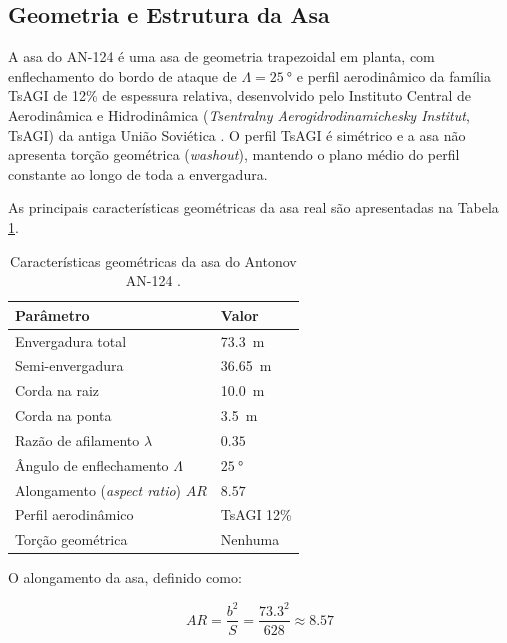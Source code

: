 \documentclass[a4paper,fleqn,noprintline]{cas-dc}
\begin{document}
\subsection{Geometria e Estrutura da Asa}

A asa do AN-124 é uma asa de geometria trapezoidal em planta, com enflechamento do bordo de ataque de $\Lambda = \qty{25}{\degree}$ e perfil aerodinâmico da família TsAGI de 12\% de espessura relativa, desenvolvido pelo Instituto Central de Aerodinâmica e Hidrodinâmica (\textit{Tsentralny Aerogidrodinamichesky Institut}, TsAGI) da antiga União Soviética \cite{Gordon2008, GarciaFernandez2025}. O perfil TsAGI é simétrico e a asa não apresenta torção geométrica (\textit{washout}), mantendo o plano médio do perfil constante ao longo de toda a envergadura.

As principais características geométricas da asa real são apresentadas na Tabela \ref{tab:asa_specs}.

\begin{table}[h!]
\centering
\caption{Características geométricas da asa do Antonov AN-124 
\cite{GarciaFernandez2025, Gordon2008}.}
\label{tab:asa_specs}
\renewcommand{\arraystretch}{1.4}
\begin{tabularx}{\textwidth}{p{5.5cm} X}
\toprule
\textbf{Parâmetro} & \textbf{Valor} \\
\midrule
Envergadura total & \SI{73.3}{\meter} \\
Semi-envergadura & \SI{36.65}{\meter} \\
Corda na raiz & \SI{10.0}{\meter} \\
Corda na ponta & \SI{3.5}{\meter} \\
Razão de afilamento $\lambda$ & $0.35$ \\
Ângulo de enflechamento $\Lambda$ & $\qty{25}{\degree}$ \\
Alongamento (\textit{aspect ratio}) $AR$ & $8.57$ \\
Perfil aerodinâmico & TsAGI 12\% \\
Torção geométrica & Nenhuma \\
\bottomrule
\end{tabularx}
\end{table}

O alongamento da asa, definido como:

\begin{equation}
    AR = \frac{b^2}{S} = \frac{73.3^2}{628} \approx 8.57
    \label{eq:aspect_ratio}
\end{equation}
\end{document}
